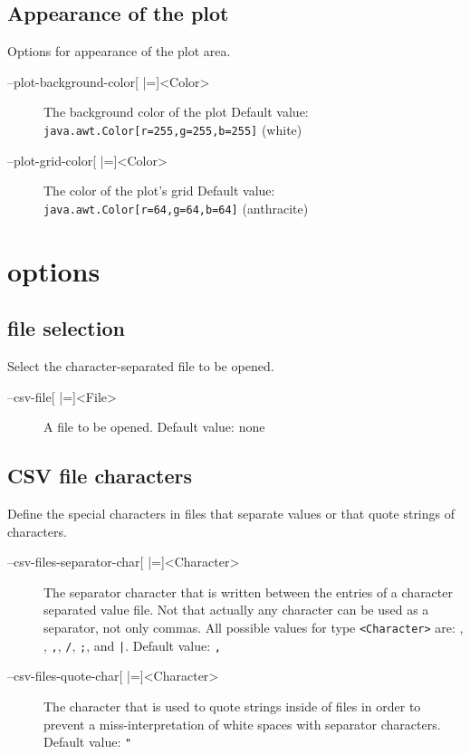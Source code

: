 \subsection{Appearance of the plot}
Options for appearance of the plot area.
\begin{description}
\item[--plot-background-color{[} |={]}<Color>]
          The background color of the plot
          Default value:\\\texttt{java.awt.Color[r=255,g=255,b=255]} (white)
\item[--plot-grid-color{[} |={]}<Color>] The color of the plot's grid
          Default value:\\\texttt{java.awt.Color[r=64,g=64,b=64]} (\textcolor{anthracite}{anthracite})
\end{description}

\section{\CSV options}
\subsection{\CSV file selection}
Select the character-separated file to be opened.
\begin{description}
\item[--csv-file{[} |={]}<File>]
          A \CSV file to be opened.
          Default value: none
\end{description}

\subsection{CSV file characters}
Define the special characters in \CSV files that separate values or that quote strings of characters.
\begin{description}
\item[--csv-files-separator-char{[} |={]}<Character>]
          The separator character that is written between the entries of
          a character separated value file. Not that actually any \UTF
          character can be used as a separator, not only commas.
          All possible values for type \texttt{<Character>} are:
          \tab, \textvisiblespace, \texttt{,}, \texttt{/}, \texttt{;}, and \texttt{|}.
          Default value: \texttt{,}
\item[--csv-files-quote-char{[} |={]}<Character>]
          The character that is used to quote strings inside of \CSV
          files in order to prevent a miss-interpretation of white
          spaces with separator characters.
          Default value: \texttt{"}
\end{description}

